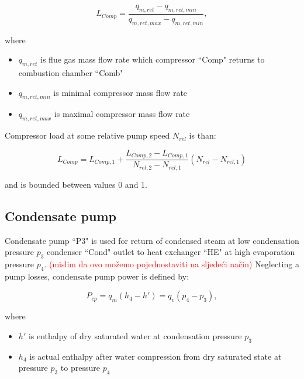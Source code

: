 \documentclass{article}
\begin{document}
	\begin{equation}\label{eq:compressor_load}
		L_{Comp} = \frac{q_{m,ret} - q_{m,ret,min}}{q_{m,ret,max} - q_{m,ret,min}},
	\end{equation}
	
	\noindent
	where
	
	\begin{itemize}
		\item $q_{m,ret}$ is flue gas mass flow rate which compressor “Comp" returns to combustion chamber “Comb"
		\item $q_{m,ret,min}$ is minimal compressor mass flow rate
		\item $q_{m,ret,max}$ is maximal compressor mass flow rate	
	\end{itemize}

	\noindent
	Compressor load at some relative pump speed $N_{rel}$ is than:
	
	\begin{equation}\label{eq:compressor_load_rel}
		L_{Comp} = L_{Comp,1} + \frac{L_{Comp,2} - L_{Comp,1}}{N_{rel,2} - N_{rel,1}} \left( N_{rel} - N_{rel,1}\right)
	\end{equation}
	
	\noindent
	and is bounded between values 0 and 1.
	
	\subsection*{Condensate pump}
	
	Condensate pump “P3" is used for return of condensed steam at low condensation pressure $p_3$ condenser “Cond" outlet to heat exchanger “HE" at high evaporation pressure $p_4$.
	\textcolor{red}{(mislim da ovo možemo pojednostaviti na sljedeći način)}
	Neglecting a pump losses, condensate pump power is defined by:

	\begin{equation}\label{eq:pump_loss}
		P_{cp} = q_m(h_4 - h') = q_v(p_4 - p_3), 
	\end{equation}

	\noindent
	where
	
	\begin{itemize}
		\item 	$h'$ is enthalpy of dry saturated water at condensation pressure $p_3$
		\item $h_4$ is actual enthalpy after water compression from dry saturated state at pressure $p_3$ to pressure $p_4$
	\end{itemize}
\end{document}
